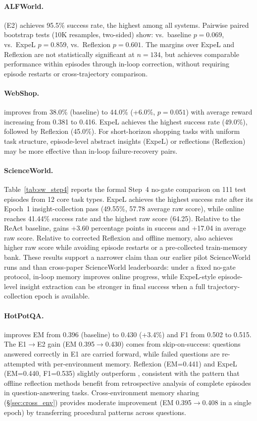 \paragraph{ALFWorld.} \method{} (E2) achieves 95.5\% success rate, the highest among all systems. Pairwise paired bootstrap tests (10K resamples, two-sided) show: vs.\ baseline $p{=}0.069$, vs.\ ExpeL $p{=}0.859$, vs.\ Reflexion $p{=}0.601$. The margins over ExpeL and Reflexion are not statistically significant at $n{=}134$, but \method{} achieves comparable performance within episodes through in-loop correction, without requiring episode restarts or cross-trajectory comparison.

\paragraph{WebShop.} \method{} improves from 38.0\% (baseline) to 44.0\% (+6.0\%, $p=0.051$) with average reward increasing from 0.381 to 0.416. ExpeL achieves the highest success rate (49.0\%), followed by Reflexion (45.0\%). For short-horizon shopping tasks with uniform task structure, episode-level abstract insights (ExpeL) or reflections (Reflexion) may be more effective than in-loop failure-recovery pairs.

\paragraph{ScienceWorld.} Table~\ref{tab:sw_step4} reports the formal Step~4 no-gate comparison on 111 test episodes from 12 core task types. ExpeL achieves the highest success rate after its Epoch~1 insight-collection pass (49.55\%, 57.78 average raw score), while online \method{} reaches 41.44\% success rate and the highest raw score (64.25). Relative to the ReAct baseline, \method{} gains +3.60 percentage points in success and +17.04 in average raw score. Relative to corrected Reflexion and offline memory, \method{} also achieves higher raw score while avoiding episode restarts or a pre-collected train-memory bank. These results support a narrower claim than our earlier pilot ScienceWorld runs and than cross-paper ScienceWorld leaderboards: under a fixed no-gate protocol, in-loop memory improves online progress, while ExpeL-style episode-level insight extraction can be stronger in final success when a full trajectory-collection epoch is available.

\paragraph{HotPotQA.} \method{} improves EM from 0.396 (baseline) to 0.430 (+3.4\%) and F1 from 0.502 to 0.515. The E1$\to$E2 gain (EM 0.395$\to$0.430) comes from skip-on-success: questions answered correctly in E1 are carried forward, while failed questions are re-attempted with per-environment memory. Reflexion (EM=0.441) and ExpeL (EM=0.440, F1=0.535) slightly outperform \method{}, consistent with the pattern that offline reflection methods benefit from retrospective analysis of complete episodes in question-answering tasks. Cross-environment memory sharing (\S\ref{sec:cross_env}) provides moderate improvement (EM 0.395$\to$0.408 in a single epoch) by transferring procedural patterns across questions.

